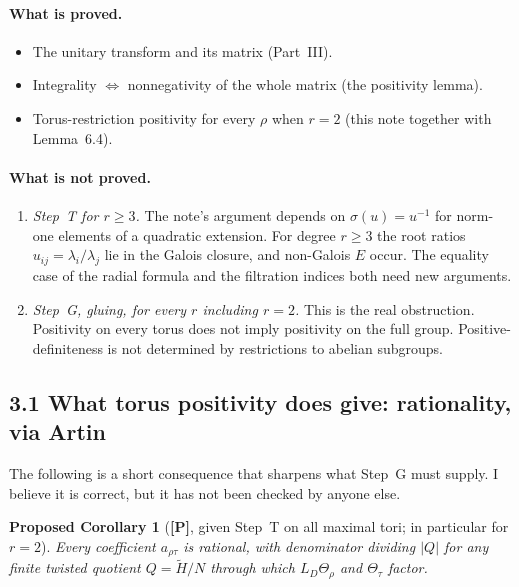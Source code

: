 \documentclass[11pt]{article}
\newcommand{\tH}{\widetilde H}
\theoremstyle{plain}
\newtheorem*{prop*}{Proposed Corollary}
\begin{document}
\paragraph{What is proved.}
\begin{itemize}
\item The unitary transform and its matrix (Part~III).
\item Integrality $\Leftrightarrow$ nonnegativity of the whole matrix
(the positivity lemma).
\item Torus-restriction positivity for every $\rho$ when $r=2$ (this
note together with Lemma~6.4).
\end{itemize}

\paragraph{What is not proved.}
\begin{enumerate}[label=(\alph*)]
\item \emph{Step~T for $r\ge3$.} The note's argument depends on
$\sigma(u)=u^{-1}$ for norm-one elements of a quadratic extension. For
degree $r\ge3$ the root ratios $u_{ij}=\lambda_i/\lambda_j$ lie in the
Galois closure, and non-Galois $E$ occur. The equality case of the
radial formula and the filtration indices both need new arguments.
\item \emph{Step~G, gluing, for every $r$ including $r=2$.} This is the
real obstruction. Positivity on every torus does not imply positivity on
the full group. Positive-definiteness is not determined by restrictions
to abelian subgroups.
\end{enumerate}

\subsection*{3.1 What torus positivity does give: rationality, via Artin}
The following is a short consequence that sharpens what Step~G must
supply. I believe it is correct, but it has not been checked by anyone
else.

\begin{prop*}[\textbf{[P]}, given Step~T on all maximal tori; in
particular for $r=2$]
Every coefficient $a_{\rho\tau}$ is rational, with denominator dividing
$|Q|$ for any finite twisted quotient $Q=\tH/N$ through which
$L_D\Theta_\rho$ and $\Theta_\tau$ factor.
\end{prop*}
\end{document}
